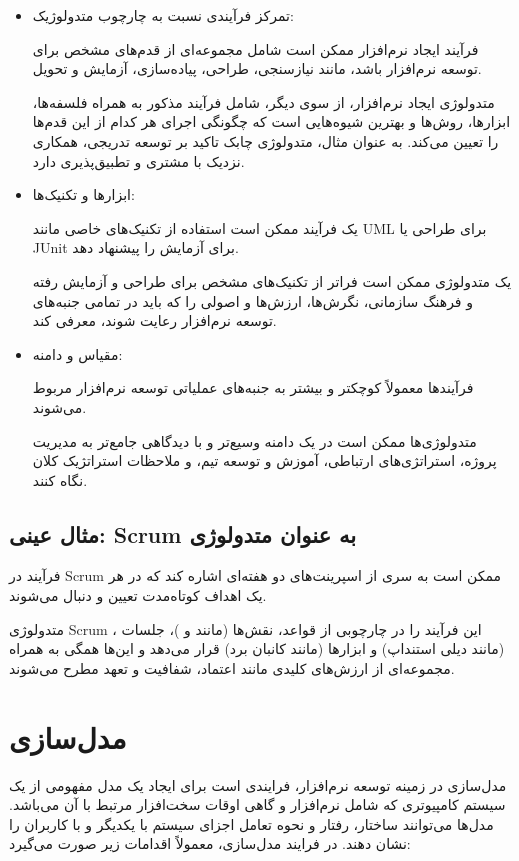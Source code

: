 \begin{itemize}
	\item تمرکز فرآیندی نسبت به چارچوب متدولوژیک:
	
	فرآیند ایجاد نرم‌افزار ممکن است شامل مجموعه‌ای از قدم‌های مشخص برای توسعه نرم‌افزار باشد، مانند نیازسنجی، طراحی، پیاده‌سازی، آزمایش و تحویل.
	
	متدولوژی ایجاد نرم‌افزار، از سوی دیگر، شامل فرآیند مذکور به همراه فلسفه‌ها، ابزارها، روش‌ها و بهترین شیوه‌هایی است که چگونگی اجرای هر کدام از این قدم‌ها را تعیین می‌کند. به عنوان مثال، متدولوژی چابک تاکید بر توسعه تدریجی، همکاری نزدیک با مشتری و تطبیق‌پذیری دارد.
	
	\item ابزارها و تکنیک‌ها:
	
	یک فرآیند ممکن است استفاده از تکنیک‌های خاصی مانند UML برای طراحی یا JUnit برای آزمایش را پیشنهاد دهد.
	
	یک متدولوژی ممکن است فراتر از تکنیک‌های مشخص برای طراحی و آزمایش رفته و فرهنگ سازمانی، نگرش‌ها، ارزش‌ها و اصولی را که باید در تمامی جنبه‌های توسعه نرم‌افزار رعایت شوند، معرفی کند.
	
	\item مقیاس و دامنه:
	
	فرآیندها معمولاً کوچکتر و بیشتر به جنبه‌های عملیاتی توسعه نرم‌افزار مربوط می‌شوند.
	
	متدولوژی‌ها ممکن است در یک دامنه وسیع‌تر و با دیدگاهی جامع‌تر به مدیریت پروژه، استراتژی‌های ارتباطی، آموزش و توسعه تیم، و ملاحظات استراتژیک کلان نگاه کنند.
\end{itemize}

\subsection*{مثال عینی: Scrum به عنوان متدولوژی}

فرآیند در Scrum ممکن است به سری از اسپرینت‌های دو هفته‌ای اشاره کند که در هر یک اهداف کوتاه‌مدت تعیین و دنبال می‌شوند.

متدولوژی Scrum ، این فرآیند را در چارچوبی از قواعد، نقش‌ها (مانند
و 
)، جلسات (مانند دیلی استنداپ) و ابزارها (مانند کانبان برد) قرار می‌دهد و این‌ها همگی به همراه مجموعه‌ای از ارزش‌های کلیدی مانند اعتماد، شفافیت و تعهد مطرح می‌شوند.

\section*{مدل‌سازی}

مدل‌سازی در زمینه توسعه نرم‌افزار، فرایندی است برای ایجاد یک مدل مفهومی از یک سیستم کامپیوتری که شامل نرم‌افزار و گاهی اوقات سخت‌افزار مرتبط با آن می‌باشد. مدل‌ها می‌توانند ساختار، رفتار و نحوه تعامل اجزای سیستم با یکدیگر و با کاربران را نشان دهند. در فرایند مدل‌سازی، معمولاً اقدامات زیر صورت می‌گیرد:

